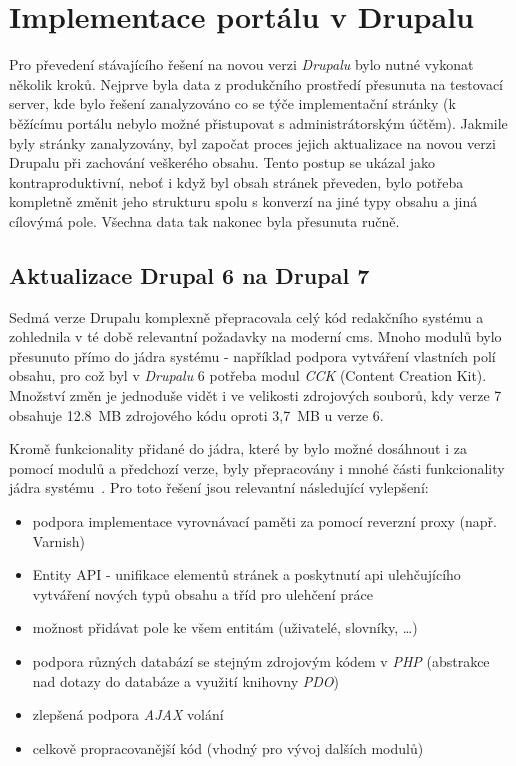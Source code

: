 \chapter{Implementace portálu v Drupalu}
\label{chap:implementace-drupal}

Pro převedení stávajícího řešení na novou verzi \emph{Drupalu} bylo nutné vykonat několik kroků. Nejprve byla data z produkčního prostředí přesunuta na testovací server, kde bylo řešení zanalyzováno co se týče implementační stránky (k běžícímu portálu nebylo možné přistupovat s administrátorským účtěm). Jakmile byly stránky zanalyzovány, byl započat proces jejich aktualizace na novou verzi Drupalu při zachování veškerého obsahu. Tento postup se ukázal jako kontraproduktivní, neboť i když byl obsah stránek převeden, bylo potřeba kompletně změnit jeho strukturu spolu s konverzí na jiné typy obsahu a jiná cílovýmá pole. Všechna data tak nakonec byla přesunuta ručně.

\section{Aktualizace Drupal 6 na Drupal 7}
\label{sec:aktualizace}
Sedmá verze Drupalu komplexně přepracovala celý kód redakčního systému a zohlednila v té době relevantní požadavky na moderní \gls{cms}. Mnoho modulů bylo přesunuto přímo do jádra systému - například podpora vytváření vlastních polí obsahu, pro což byl v \emph{Drupalu} 6 potřeba modul \emph{CCK} (Content Creation Kit). Množství změn je jednoduše vidět i ve velikosti zdrojových souborů, kdy verze 7 obsahuje 12.8~MB zdrojového kódu oproti 3,7~MB u verze 6.

Kromě funkcionality přidané do jádra, které by bylo možné dosáhnout i za pomocí modulů a předchozí verze, byly přepracovány i mnohé části funkcionality jádra systému~\cite{website:drupal-comparison}. Pro toto řešení jsou relevantní následující vylepšení:

\begin{itemize}
  \item podpora implementace vyrovnávací paměti za pomocí reverzní proxy (např. Varnish)
  \item Entity API - unifikace elementů stránek a poskytnutí \gls{api} ulehčujícího vytváření nových typů obsahu a tříd pro ulehčení práce~\cite{drupal-entities}
  \item možnost přidávat pole ke všem entitám (uživatelé, slovníky, \dots)
  \item podpora různých databází se stejným zdrojovým kódem v \emph{PHP} (abstrakce nad dotazy do databáze a využití knihovny \emph{PDO})
  \item zlepšená podpora \emph{AJAX} volání
  \item celkově propracovanější kód (vhodný pro vývoj dalších modulů)
\end{itemize}

